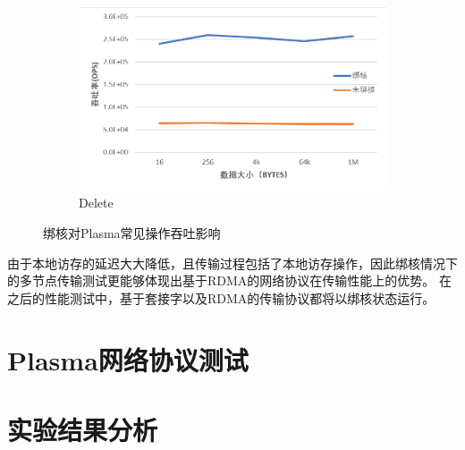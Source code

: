 \begin{figure}[h]
    \begin{subfigure}{0.33\textwidth}
        \includegraphics[width=\textwidth]{image/chap04/del.png}
        \caption{Delete}
    \end{subfigure}
    \caption{绑核对Plasma常见操作吞吐影响}
    \label{fig:numa}
\end{figure}

由于本地访存的延迟大大降低，且传输过程包括了本地访存操作，因此绑核情况下的多节点传输测试更能够体现出基于RDMA的网络协议在传输性能上的优势。
在之后的性能测试中，基于套接字以及RDMA的传输协议都将以绑核状态运行。

\section{Plasma网络协议测试}

\section{实验结果分析}